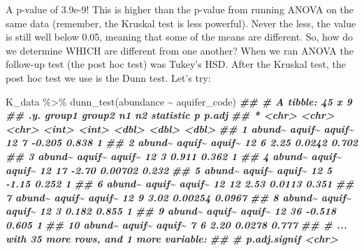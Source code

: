 \documentclass[
]{krantz}
\newenvironment{Shaded}{\begin{snugshade}}{\end{snugshade}}
\newcommand{\DocumentationTok}[1]{\textcolor[rgb]{0.56,0.35,0.01}{\textbf{\textit{#1}}}}
\newcommand{\FunctionTok}[1]{\textcolor[rgb]{0.00,0.00,0.00}{#1}}
\newcommand{\NormalTok}[1]{#1}
\newcommand{\SpecialCharTok}[1]{\textcolor[rgb]{0.00,0.00,0.00}{#1}}
\begin{document}
A p-value of 3.9e-9! This is higher than the p-value from running ANOVA on the same data (remember, the Kruskal test is less powerful). Never the less, the value is still well below 0.05, meaning that some of the means are different. So, how do we determine WHICH are different from one another? When we ran ANOVA the follow-up test (the post hoc test) was Tukey's HSD. After the Kruskal test, the post hoc test we use is the Dunn test. Let's try:

\begin{Shaded}
\begin{Highlighting}[]
\NormalTok{K\_data }\SpecialCharTok{\%\textgreater{}\%}
  \FunctionTok{dunn\_test}\NormalTok{(abundance }\SpecialCharTok{\textasciitilde{}}\NormalTok{ aquifer\_code)}
\DocumentationTok{\#\# \# A tibble: 45 x 9}
\DocumentationTok{\#\#    .y.    group1 group2    n1    n2 statistic       p  p.adj}
\DocumentationTok{\#\#  * \textless{}chr\textgreater{}  \textless{}chr\textgreater{}  \textless{}chr\textgreater{}  \textless{}int\textgreater{} \textless{}int\textgreater{}     \textless{}dbl\textgreater{}   \textless{}dbl\textgreater{}  \textless{}dbl\textgreater{}}
\DocumentationTok{\#\#  1 abund\textasciitilde{} aquif\textasciitilde{} aquif\textasciitilde{}    12     7    {-}0.205 0.838   1     }
\DocumentationTok{\#\#  2 abund\textasciitilde{} aquif\textasciitilde{} aquif\textasciitilde{}    12     6     2.25  0.0242  0.702 }
\DocumentationTok{\#\#  3 abund\textasciitilde{} aquif\textasciitilde{} aquif\textasciitilde{}    12     3     0.911 0.362   1     }
\DocumentationTok{\#\#  4 abund\textasciitilde{} aquif\textasciitilde{} aquif\textasciitilde{}    12    17    {-}2.70  0.00702 0.232 }
\DocumentationTok{\#\#  5 abund\textasciitilde{} aquif\textasciitilde{} aquif\textasciitilde{}    12     5    {-}1.15  0.252   1     }
\DocumentationTok{\#\#  6 abund\textasciitilde{} aquif\textasciitilde{} aquif\textasciitilde{}    12    12     2.53  0.0113  0.351 }
\DocumentationTok{\#\#  7 abund\textasciitilde{} aquif\textasciitilde{} aquif\textasciitilde{}    12     9     3.02  0.00254 0.0967}
\DocumentationTok{\#\#  8 abund\textasciitilde{} aquif\textasciitilde{} aquif\textasciitilde{}    12     3     0.182 0.855   1     }
\DocumentationTok{\#\#  9 abund\textasciitilde{} aquif\textasciitilde{} aquif\textasciitilde{}    12    36    {-}0.518 0.605   1     }
\DocumentationTok{\#\# 10 abund\textasciitilde{} aquif\textasciitilde{} aquif\textasciitilde{}     7     6     2.20  0.0278  0.777 }
\DocumentationTok{\#\# \# ... with 35 more rows, and 1 more variable:}
\DocumentationTok{\#\# \#   p.adj.signif \textless{}chr\textgreater{}}
\end{Highlighting}
\end{Shaded}
\end{document}
